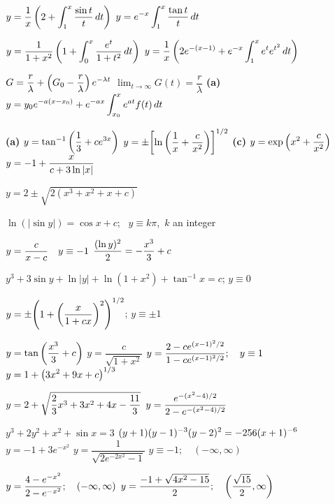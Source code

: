    $\displaystyle{y=\frac{1}{x}\left(2 +\int^x_1\frac{\sin t}{t}\, dt\right)}$
   $\displaystyle{y=e^{-x}
\int^x_1 \frac{\tan t}{t}\, dt}$

$\displaystyle{y=\frac{1}{1+x^2}\left(1+\int^x_0
\frac{e^t}{1+t^2}\, dt\right)}$
$\displaystyle{y=\frac{1}{x}\left(2e^{-(x-1)}+e^{-x}
\int_1^x e^te^{t^2}\,dt\right)}$

$G=\displaystyle{\frac{r}{\lambda}+\left(G_0-\frac{r}{\lambda}\right)e^{-\lambda
t}}$\; $\lim_{t\to\infty}G(t)=\dfrac{r}{\lambda}$
{\bfseries  (a)}  $\displaystyle{y=y_0 e^{-a(x-x_0)}+ e^{-ax}
\int^x_{x_0} e^{at}f(t)\, dt}$


{\bfseries  (a)} $\displaystyle{y=\tan^{-1}\left(\frac{1}{3} + ce^{3x}\right)}$
$y=\pm\displaystyle{\left[\ln\left(\dfrac{1}{x}+\dfrac{c}{x^2}\right)\right]^{1/2}}$
 {\bfseries  (c)} $\displaystyle{y=\exp\left(x^2 + \frac{c}{x^2}\right)}$
 $\displaystyle{y=-1 + \frac{x}{c + 3\ln |x|}}$




 $y=2\pm\sqrt{2(x^3+x^2+x+c)}$

 $\ln (|\sin y|) = \cos x+c$;   \, $y \equiv k \pi$,\, $k$
an integer

 $\displaystyle{y=\frac{c}{x-c}   \quad y \equiv -1}$      \quad
{}
$\displaystyle\frac{(\ln y)^2}{2}=-\frac{x^3}{3}+c$

$y^3+3 \sin y + \ln |y|+\ln (1+x^2)+\tan^{-1}x=c$;   $y\equiv0$

$y=\pm\displaystyle{\left(1+\left(\frac{x}{1+cx}\right)^2\right)^{1/2}}$;
$y\equiv\pm1$

 $\displaystyle{y=\tan \left( \frac{x^3}{3}+c\right)}$
 $y=\dfrac{c}{\sqrt{1+x^2}}$
$\displaystyle{y= \frac{2 - ce^{(x-1)^2/2}}{1-ce^{(x-1)^2/2}};   \quad y \equiv
1}$
$\displaystyle{y=1+\bigl(3x^2+9x+c\bigr)^{1/3}}$


 $\displaystyle{y=2+\sqrt{\frac{2}{3}x^3+3x^2+4x -\frac{11}{3}}}$
 $\displaystyle{y=\frac{e^{-(x^2-4)/2}}{2-e^{-(x^2-4)/2}}}$

 $y^3+2y^2+x^2+\sin x=3$
 $\displaystyle{(y+1)(y-1)^{-3}(y-2)^2=-256(x+1)^{-6}}$
 $y=-1+3e^{-x^2}$
 $y=\dfrac{1}{\sqrt{2e^{-2x^2}-1}}$
 $y \equiv -1;   \quad (-\infty,\infty)$

 $\displaystyle{y=\frac{4-e^{-x^2}}{2-e^{-x^2}};   \quad (-\infty,\infty)}$
 $\displaystyle{y=\frac{-1+\sqrt{4x^2-15}}{2};   \quad\left(\frac{\sqrt{15}}{2}, \infty\right)}$


